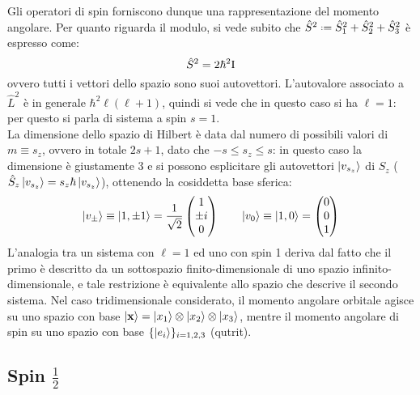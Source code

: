 Gli operatori di spin forniscono dunque una rappresentazione del momento angolare. Per quanto riguarda il modulo, si vede subito che $ \hat{S}^2 \defeq \hat{S}_1^2 + \hat{S}_2^2 + \hat{S}_3^2 $ è espresso come:
\begin{equation}
	\hat{S}^2 = 2\hbar^2 \mathbf{\text{I}}
	\label{eq:2.43}
\end{equation}
ovvero tutti i vettori dello spazio sono suoi autovettori. L'autovalore associato a $ \hat{L}^2 $ è in generale $ \hbar^2 \ell (\ell + 1) $, quindi si vede che in questo caso si ha $ \ell = 1 $: per questo si parla di sistema a spin $ s = 1 $.\\
La dimensione dello spazio di Hilbert è data dal numero di possibili valori di $ m \equiv s_z $, ovvero in totale $ 2s + 1 $, dato che $ -s \le s_z \le s $: in questo caso la dimensione è giustamente 3 e si possono esplicitare gli autovettori $ \ket{v_{s_z}} $ di $ \hat{S}_z $ ($ \hat{S}_z \ket{v_{s_z}} = s_z\hbar \ket{v_{s_z}} $), ottenendo la cosiddetta base sferica:
\begin{equation}
	\ket{v_{\pm}} \equiv \ket{1,\pm 1} = \frac{1}{\sqrt{2}}
	\begin{pmatrix}
		1 \\ \pm i \\ 0
	\end{pmatrix}
	\qquad
	\ket{v_0} \equiv \ket{1,0} =
	\begin{pmatrix}
		0 \\ 0 \\ 1
	\end{pmatrix}
	\label{eq:2.44}
\end{equation}
L'analogia tra un sistema con $ \ell = 1 $ ed uno con spin 1 deriva dal fatto che il primo è descritto da un sottospazio finito-dimensionale di uno spazio infinito-dimensionale, e tale restrizione è equivalente allo spazio che descrive il secondo sistema. Nel caso tridimensionale considerato, il momento angolare orbitale agisce su uno spazio con base $ \ket{\mathbf{x}} = \ket{x_1} \otimes \ket{x_2} \otimes \ket{x_3} $, mentre il momento angolare di spin su uno spazio con base $ \{\ket{e_i}\}_{i=1,2,3} $ (qutrit).

\subsection{Spin \texorpdfstring{$ \frac{1}{2} $}{TEXT}}

